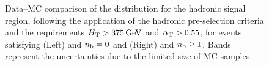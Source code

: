 \begin{figure}[!h]
  \centering
  \caption{Data--MC comparison of the \alphat distribution for the
    hadronic signal region, following the application of the hadronic
    pre-selection criteria and the requirements $\mbox{$H_\text{T}$} > 375\,\text{Ge\hspace{-.08em}V}$
    and $\alpha_{\text{T}} > 0.55$, for events satisfying (Left) \njetlow and
    $n_{\text{b}} = 0$ and (Right) \njethigh and $n_{\text{b}} \geq 1$. Bands represent
    the uncertainties due to the limited size of MC samples.}
  \label{fig:figures_AlphaT_all}
\end{figure}

